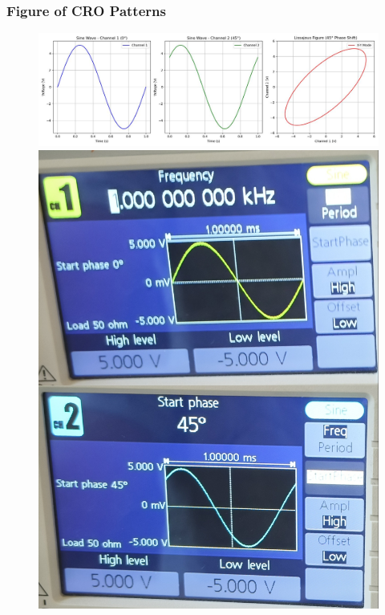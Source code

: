 \documentclass[12pt,a4paper]{report}
\begin{document}
\subsubsection*{Figure of CRO Patterns}
\begin{figure}[H] %
    \centering
    \includegraphics[width=\textwidth]{figs/4.jpg} %
    \begin{minipage}[c]{0.48\textwidth}
        \includegraphics[width=\textwidth]{figs/4read.jpg} %
        

\end{minipage}
\end{figure}
\end{document}
